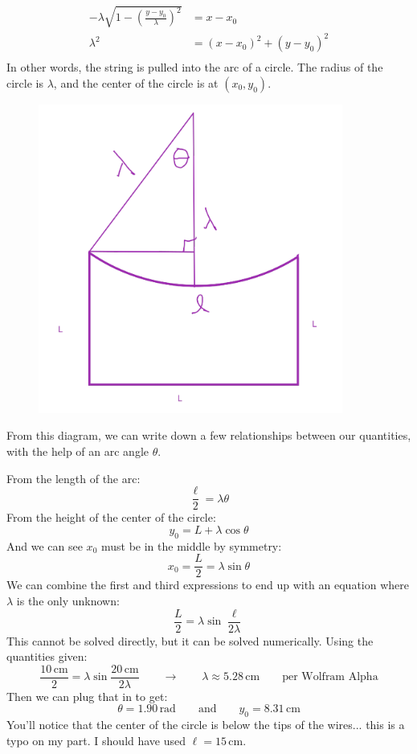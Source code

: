 \documentclass{article}
\begin{document}
{\begin{align*}
    -\lambda \sqrt{ 1 -  \left( \frac{y - y_0}{\lambda} \right)^2 } &= x - x_0 \\
    \lambda^2 &= (x - x_0)^2 + (y-y_0)^2 \\
\end{align*}
In other words, the string is pulled into the arc of a circle. The radius of the circle is $\lambda$, and the center of the circle is at $(x_0, y_0)$.
\begin{figure}[h]
\includegraphics[width=10cm]{circular-arc.png}
\centering
\end{figure}
From this diagram, we can write down a few relationships between our quantities, with the help of an arc angle $\theta$. 

From the length of the arc:
$$
\frac{\ell}{2} = \lambda \theta
$$
From the height of the center of the circle:
$$
y_0 = L + \lambda \cos\theta
$$
And we can see $x_0$ must be in the middle by symmetry:
$$
x_0 = \frac{L}{2} = \lambda \sin\theta
$$
We can combine the first and third expressions to end up with an equation where $\lambda$ is the only unknown:
$$
\frac{L}{2} = \lambda \sin \frac{\ell}{2\lambda}
$$
This cannot be solved directly, but it can be solved numerically. Using the quantities given:
$$
\frac{10\, \text{cm}}{2} = \lambda \sin \frac{20\, \text{cm}}{2 \lambda}
\quad\quad\rightarrow\quad\quad
\lambda \approx 5.28 \, \text{cm}
\quad\quad\text{per Wolfram Alpha}
$$
Then we can plug that in to get:
$$
\theta = 1.90 \, \text{rad}
\quad\quad\text{and}\quad\quad
y_0 = 8.31 \, \text{cm}
$$
You'll notice that the center of the circle is below the tips of the wires... this is a typo on my part. I should have used $\ell=15\, \text{cm}$.

}
\end{document}
